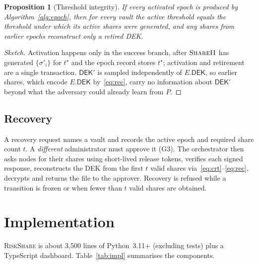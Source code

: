 \documentclass[conference]{IEEEtran}
\newtheorem{proposition}{Proposition}
\newcommand{\RS}{\textsc{RiskShare}}
\newcommand{\DEK}{\mathsf{DEK}}
\begin{document}
\begin{proposition}[Threshold integrity]
If every activated epoch is produced by Algorithm~\ref{alg:epoch}, then for every vault the active threshold equals the threshold under which its active shares were generated, and any shares from earlier epochs reconstruct only a retired DEK.
\end{proposition}
\begin{proof}[Sketch]
Activation happens only in the success branch, after $\textsc{ShareII}$ has generated $\{\sigma'_i\}$ for $t^\star$ and the epoch record stores $t^\star$; activation and retirement are a single transaction. $\DEK'$ is sampled independently of $E.\DEK$, so earlier shares, which encode $E.\DEK$ by~\eqref{eq:rec}, carry no information about $\DEK'$ beyond what the adversary could already learn from $P$.
\end{proof}

\subsection{Recovery}
A recovery request names a vault and records the active epoch and required share count $t$. A \emph{different} administrator must approve it (G3). The orchestrator then asks nodes for their shares using short-lived release tokens, verifies each signed response, reconstructs the DEK from the first $t$ valid shares via~\eqref{eq:crt}--\eqref{eq:rec}, decrypts and returns the file to the approver. Recovery is refused while a transition is frozen or when fewer than $t$ valid shares are obtained.

\section{Implementation}
\label{sec:impl}

\RS{} is about 3{,}500 lines of Python~3.11+ (excluding tests) plus a TypeScript dashboard. Table~\ref{tab:impl} summarises the components.
\end{document}
